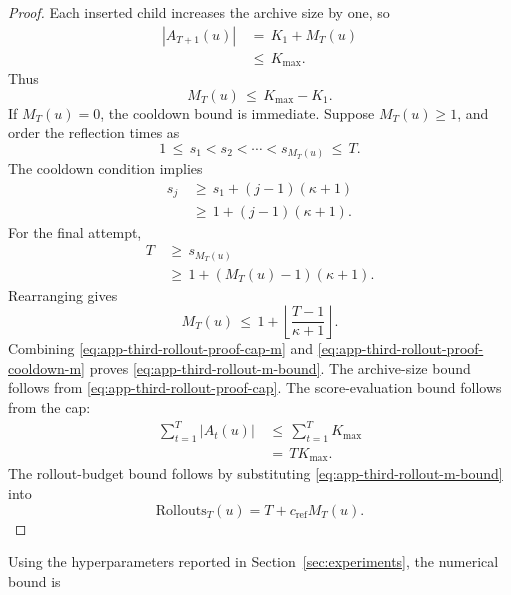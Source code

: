 \documentclass{article} %
\begin{document}
\begin{proof}
Each inserted child increases the archive size by one, so
\begin{align}
\label{eq:app-third-rollout-proof-cap}
|A_{T+1}(u)|
&\,=\,
K_1+M_T(u)
\\
&\,\le\,
K_{\max}.
\end{align}
Thus
\begin{equation}
\label{eq:app-third-rollout-proof-cap-m}
M_T(u)
\,\le\,
K_{\max}-K_1.
\end{equation}
If \(M_T(u)=0\), the cooldown bound is immediate. Suppose \(M_T(u)\ge1\), and
order the reflection times as
\begin{equation}
\label{eq:app-third-rollout-proof-times}
1
\,\le\,
s_1
<
s_2
<
\cdots
<
s_{M_T(u)}
\,\le\,
T.
\end{equation}
The cooldown condition implies
\begin{align}
\label{eq:app-third-rollout-proof-spacing}
s_j
&\,\ge\,
s_1+(j-1)(\kappa+1)
\\
&\,\ge\,
1+(j-1)(\kappa+1).
\end{align}
For the final attempt,
\begin{align}
\label{eq:app-third-rollout-proof-final-time}
T
&\,\ge\,
s_{M_T(u)}
\\
&\,\ge\,
1+(M_T(u)-1)(\kappa+1).
\end{align}
Rearranging gives
\begin{equation}
\label{eq:app-third-rollout-proof-cooldown-m}
M_T(u)
\,\le\,
1+\left\lfloor\frac{T-1}{\kappa+1}\right\rfloor.
\end{equation}
Combining \eqref{eq:app-third-rollout-proof-cap-m} and \eqref{eq:app-third-rollout-proof-cooldown-m} proves \eqref{eq:app-third-rollout-m-bound}.  The archive-size bound follows from \eqref{eq:app-third-rollout-proof-cap}.  The score-evaluation bound follows from the cap:
\begin{align}
\label{eq:app-third-rollout-proof-score}
\sum_{t=1}^{T}|A_t(u)|
&\,\le\,
\sum_{t=1}^{T}K_{\max}
\\
&\,=\,
T K_{\max}.
\end{align}
The rollout-budget bound follows by substituting \eqref{eq:app-third-rollout-m-bound} into
\begin{equation}
\label{eq:app-third-rollout-proof-budget}
\mathrm{Rollouts}_T(u)
=
T+c_{\mathrm{ref}}M_T(u).
\end{equation}
\end{proof}

Using the hyperparameters reported in Section~\ref{sec:experiments}, the numerical bound is
\end{document}
